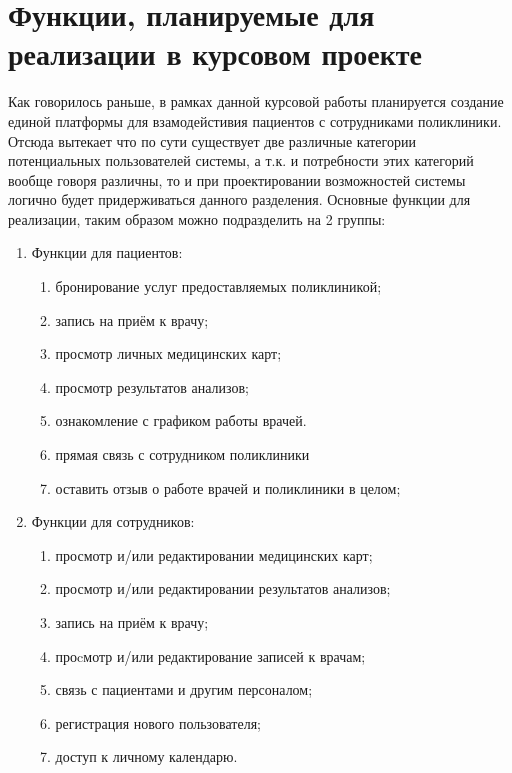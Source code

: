 \documentclass[14pt,a4paper,russian]{extreport}
\begin{document}
\section{Функции, планируемые для реализации в курсовом проекте}
Как говорилось раньше, в рамках данной курсовой работы планируется создание единой платформы для
взамодейстивия пациентов с сотрудниками поликлиники. Отсюда вытекает что по сути существует две
различные категории потенциальных пользователей системы, а т.к. и потребности этих категорий вообще
говоря различны, то и при проектировании возможностей системы логично будет придерживаться данного
разделения. Основные функции для реализации, таким образом можно подразделить на 2 группы: 
\begin{enumerate}[noitemsep]
    \item Функции для пациентов:
        \begin{enumerate}[noitemsep]
            \item бронирование услуг предоставляемых поликлиникой;
            \item запись на приём к врачу;
            \item просмотр личных медицинских карт;
            \item просмотр результатов анализов;
            \item ознакомление с графиком работы врачей.
            \item прямая связь с сотрудником поликлиники
            \item оставить отзыв о работе врачей и поликлиники в целом;
        \end{enumerate}
    \item Функции для сотрудников:
        \begin{enumerate}
            \item просмотр и/или редактировании медицинских карт;
            \item просмотр и/или редактировании результатов анализов;
            \item запись на приём к врачу;
            \item проcмотр и/или редактирование записей к врачам;
            \item связь с пациентами и другим персоналом;
            \item регистрация нового пользователя;
            \item доступ к личному календарю.
        \end{enumerate}
\end{enumerate}
\end{document}
